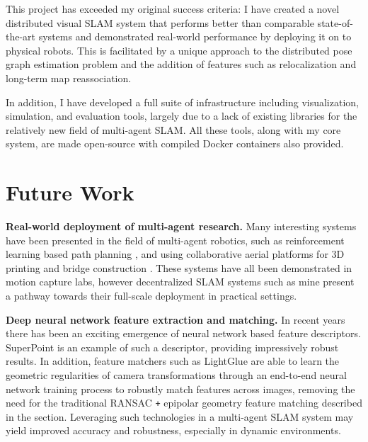 

\label{sec:5}
This project has exceeded my original success criteria: I have created a novel distributed visual SLAM system that performs better than comparable state-of-the-art systems and demonstrated real-world performance by deploying it on to physical robots. This is facilitated by a unique approach to the distributed pose graph estimation problem and the addition of features such as relocalization and long-term map reassociation.

In addition, I have developed a full suite of infrastructure including visualization, simulation, and evaluation tools, largely due to a lack of existing libraries for the relatively new field of multi-agent SLAM. All these tools, along with my core system, are made open-source with compiled Docker containers also provided.

\section{Future Work}
\label{sec:future-work}
\textbf{Real-world deployment of multi-agent research.} Many interesting systems have been presented in the field of multi-agent robotics, such as reinforcement learning based path planning \autocite{bettini2022vmas}, and using collaborative aerial platforms for 3D printing \autocite{zhang2022aerial} and bridge construction \autocite{1d3d53ca-43c1-3e44-8ce1-3b0c374a8f1e}. These systems have all been demonstrated in motion capture labs, however decentralized SLAM systems such as mine present a pathway towards their full-scale deployment in practical settings.

\textbf{Deep neural network feature extraction and matching.} In recent years there has been an exciting emergence of neural network based feature descriptors. SuperPoint \autocite{detone18superpoint} is an example of such a descriptor, providing impressively robust results. In addition, feature matchers such as LightGlue \autocite{lindenberger2023lightglue} are able to learn the geometric regularities of camera transformations through an end-to-end neural network training process to robustly match features across images, removing the need for the traditional RANSAC \texttt{+} epipolar geometry feature matching described in the  section. Leveraging such technologies in a multi-agent SLAM system may yield improved accuracy and robustness, especially in dynamic environments.

